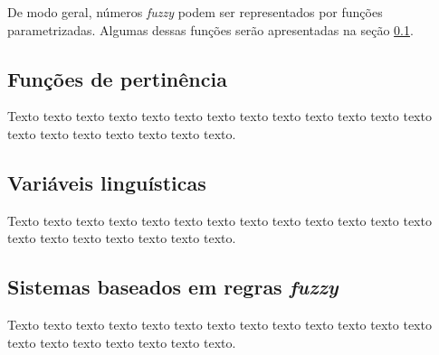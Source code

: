 De modo geral, números \emph{fuzzy} podem ser representados por funções parametrizadas. Algumas dessas funções serão apresentadas na seção \ref{sec:funcoes_pertinencia}.

\subsection{Funções de pertinência}
\label{sec:funcoes_pertinencia}
Texto texto texto texto texto texto texto texto texto texto texto texto texto
texto texto texto texto texto texto texto.


\subsection{Variáveis linguísticas}
\label{sec:variaveis_linguisticas}
Texto texto texto texto texto texto texto texto texto texto texto texto texto
texto texto texto texto texto texto texto.


\subsection{Sistemas baseados em regras \emph{fuzzy}}
\label{sec:sistemas_regras_fuzzy}
Texto texto texto texto texto texto texto texto texto texto texto texto texto
texto texto texto texto texto texto texto.










